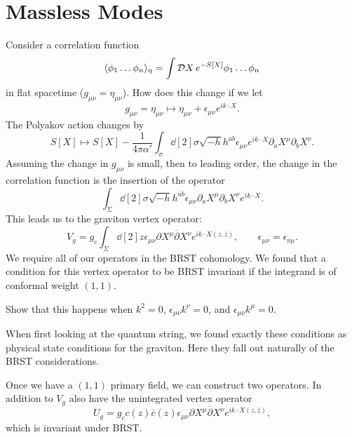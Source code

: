 
\section{Massless Modes}%
\label{sec:massless_modes}

Consider a correlation function
\begin{equation}
  \langle \phi_1 \dots \phi_n \rangle_\eta = \int \mathop{\mathcal{D} X} e^{-S[X]} \phi_1 \dots \phi_n
\end{equation}
in flat spacetime ($g_{\mu\nu} = \eta_{\mu\nu}$).
How does this change if we let
\begin{equation}
  g_{\mu\nu} = \eta_{\mu\nu} \mapsto \eta_{\mu\nu} + \epsilon_{\mu\nu} e^{i k \cdot X}.
\end{equation}
The Polyakov action changes by 
\begin{equation}
  S[X] \mapsto S[X] - \frac{1}{4 \pi \alpha'} \int_{\sigma} \dd[2]{\sigma} \sqrt{-h} h^{ab} \epsilon_{\mu\nu} e^{i k \cdot X} \partial_{a} X^{\mu} \partial_{b} X^{\nu}.
\end{equation}
Assuming the change in $g_{\mu\nu}$ is small, then to leading order, the change in the correlation function is the insertion of the operator
\begin{equation}
  \int_{\Sigma}	\dd[2]{\sigma} \sqrt{-h}h^{ab} \epsilon_{\mu\nu} \partial_{a} X^{\mu} \partial_{b} X^{\nu} e^{i k \cdot X}.
\end{equation}
This leads us to the graviton vertex operator:
\begin{equation}
  V_g = g_c \int_{\Sigma} \dd[2]{z} \epsilon_{\mu\nu} \partial X^{\mu} \overline{\partial}{} X^{\nu} e^{i k \cdot X(z, \overline{z}{})}, \qquad \epsilon_{\mu\nu} = \epsilon_{\nu\mu}.
\end{equation}
We require all of our operators in the BRST cohomology. We found that a condition for this vertex operator to be BRST invariant if the integrand is of conformal weight $(1,1)$.
\begin{exercise}
  Show that this happens when $k^2 = 0$, $\epsilon_{\mu\nu} k^{\nu} = 0$, and $\epsilon_{\mu\nu} k^{\mu} = 0$.
\end{exercise}

When first looking at the quantum string, we found exactly these conditions as physical state conditions for the graviton. Here they fall out naturally of the BRST considerations. 

Once we have a $(1, 1)$ primary field, we can construct two operators.
In addition to $V_g$ also have the unintegrated vertex operator 
\begin{equation}
  U_g = g_c c(z) \overline{c}{}(z) \epsilon_{\mu\nu} \partial X^{\mu} \overline{\partial}{} X^{\nu} e^{i k \cdot X(z, \overline{z}{})},
\end{equation}
which is invariant under BRST.

